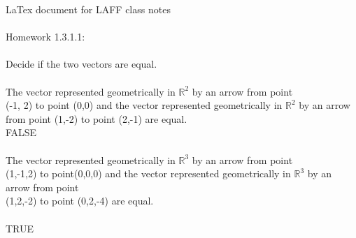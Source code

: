 \documentclass[11pt]{article}
\begin{document}
LaTex document for LAFF class notes
\\
\\
Homework 1.3.1.1:
\\
\\
Decide if the two vectors are equal.
\\
\\The vector represented geometrically in 
$\mathbb{R}^2$
by an arrow from point    
\\(-1, 2) to point (0,0) and the vector represented geometrically 
in 
$\mathbb{R}^2$
by an arrow from point (1,-2) to point (2,-1) are equal.\linebreak\\FALSE\\
\\The vector represented geometrically in 
$\mathbb{R}^3$
by an arrow from point
\\(1,-1,2) to point(0,0,0) and the vector represented
geometrically in 
$\mathbb{R}^3$
by an arrow from point
\\(1,2,-2) to point (0,2,-4) are equal.\\
\\TRUE
\end{document}
